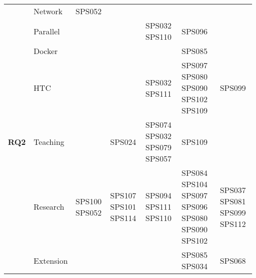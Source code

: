 \begin{table*}[htbp]
\begin{tabularx}{\textwidth}{p{0.8cm}p{2.5cm}>{\raggedright\arraybackslash}X>{\raggedright\arraybackslash}X>{\raggedright\arraybackslash}X>{\raggedright\arraybackslash}X>{\raggedright\arraybackslash}X}
		\addlinespace[0.3em]
		                                     & Network                 & SPS052             &                      &                             &                                                  &                             \\
		\addlinespace[0.3em]
		                                     & Parallel                &                    &                      & SPS032 SPS110               & SPS096                                           &                             \\
		\addlinespace[0.3em]
		                                     & Docker                  &                    &                      &                             & SPS085                                           &                             \\
		\addlinespace[0.3em]
		                                     & HTC                     &                    &                      & SPS032 SPS111               & SPS097 SPS080 SPS090 SPS102 SPS109               & SPS099                      \\
		\midrule
		\multirow{0}{*}[1.2em]{\textbf{RQ2}} & Teaching                &                    & SPS024               & SPS074 SPS032 SPS079 SPS057 & SPS109                                           &                             \\
		\addlinespace[0.3em]
		                                     & Research                & SPS100 SPS052      & SPS107 SPS101 SPS114 & SPS094 SPS111 SPS110        & SPS084 SPS104	SPS097 SPS096 SPS080 SPS090 SPS102 & SPS037 SPS081 SPS099 SPS112 \\
		\addlinespace[0.3em]
		                                     & Extension               &                    &                      &                             & SPS085 SPS034                                    & SPS068                      \\
		\bottomrule
	\end{tabularx}
\end{table*}

